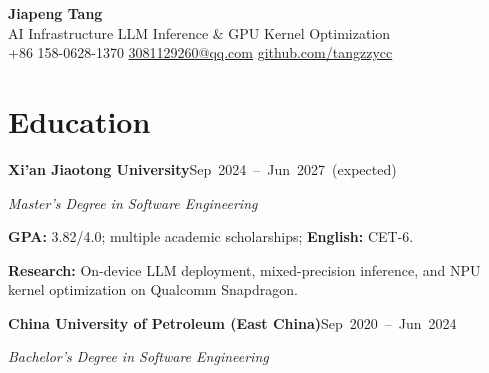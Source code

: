\documentclass[10pt,a4paper]{article}
\newcommand{\entry}[2]{\par\noindent\textbf{#1}\hfill\mbox{#2}\par}
\begin{document}
\fontsize{10.5pt}{12pt}\selectfont
\begin{center}
  {\LARGE\bfseries Jiapeng Tang}\\[3pt]
  AI Infrastructure \textbar{} LLM Inference \& GPU Kernel Optimization\\[2pt]
  +86 158-0628-1370 \textbar{}
  \href{mailto:3081129260@qq.com}{3081129260@qq.com} \textbar{}
  \href{https://github.com/tangzzycc}{github.com/tangzzycc}
\end{center}
\vspace{-7pt}

\section{Education}
\entry{Xi'an Jiaotong University}{Sep 2024 -- Jun 2027 (expected)}
\textit{Master's Degree in Software Engineering}\par
\textbf{GPA:} 3.82/4.0; multiple academic scholarships; \textbf{English:} CET-6.\par
\textbf{Research:} On-device LLM deployment,
mixed-precision inference, and NPU kernel optimization on Qualcomm Snapdragon.
\par\vspace{3pt}
\entry{China University of Petroleum (East China)}{Sep 2020 -- Jun 2024}
\textit{Bachelor's Degree in Software Engineering}\par
\end{document}
